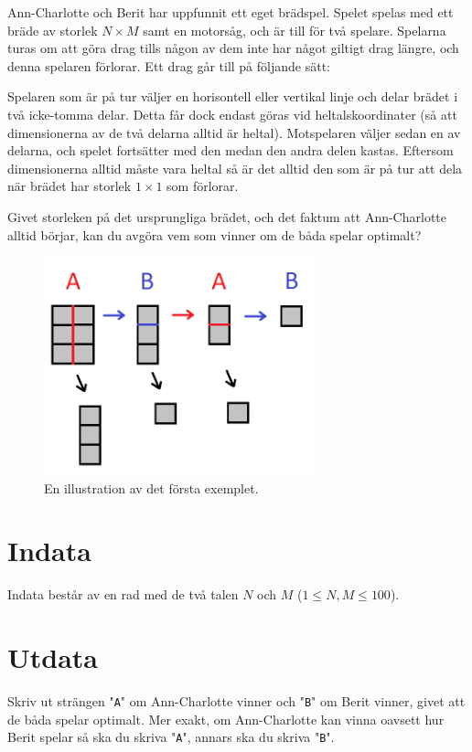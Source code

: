 Ann-Charlotte och Berit har uppfunnit ett eget brädspel. Spelet spelas med ett
bräde av storlek $N \times M$ samt en motorsåg, och är till för två spelare.
Spelarna turas om att göra drag tills någon av dem inte har något giltigt drag
längre, och denna spelaren förlorar. Ett drag går till på följande sätt:

Spelaren som är på tur väljer en horisontell eller vertikal linje och delar
brädet i två icke-tomma delar. Detta får dock endast göras vid heltalskoordinater (så att
dimensionerna av de två delarna alltid är heltal). Motspelaren väljer sedan en av
delarna, och spelet fortsätter med den medan den andra delen kastas. Eftersom
dimensionerna alltid måste vara heltal så är det alltid den som är på tur att
dela när brädet har storlek $1 \times 1$ som förlorar.

Givet storleken på det ursprungliga brädet, och det faktum att Ann-Charlotte
alltid börjar, kan du avgöra vem som vinner om de båda spelar optimalt?

\begin{figure}[ht!]
\centering
\includegraphics[width=0.7\textwidth]{bradspelet.png}
\caption{En illustration av det första exemplet.}
\label{overflow}
\end{figure}

\section*{Indata}
Indata består av en rad med de två talen $N$ och $M$ ($1 \le N,M \le 100$).

\section*{Utdata}
Skriv ut strängen "\texttt{A}" om Ann-Charlotte vinner och "\texttt{B}" om
Berit vinner, givet att de båda spelar optimalt. Mer exakt, om Ann-Charlotte
kan vinna oavsett hur Berit spelar så ska du skriva "\texttt{A}", annars ska du
skriva "\texttt{B}".

